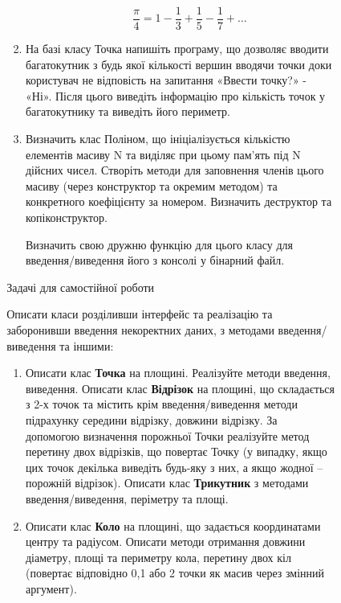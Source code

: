 \documentclass[]{article}
\makeatletter
\newcommand{\xslalph}[1]{\expandafter\@xslalph\csname c@#1\endcsname}
\newcommand{\@xslalph}[1]{%
    \ifcase#1\or а\or б\or в\or г\or д\or e\or є\or ж\or з\or i%
    \or й\or к\or л\or м\or н\or о\or п\or р\or с\or т%
    \or у\or ф\or х\or ц\or ч\or ш\or ю\or я\or аа\or бб\or вв%
    \else\@ctrerr\fi%
}
\makeatother
\begin{document}
\begin{enumerate}
\begin{enumerate}[label=\xslalph*)]
\begin{enumerate}
\begin{enumerate}[label=\xslalph*)]
\begin{enumerate}
\begin{itemize}
\[\frac{\pi}{4} = 1 - \frac{1}{3} + \frac{1}{5} - \frac{1}{7} + \ldots\]

\end{itemize}

\item
  На базі класу Точка напишіть програму, що дозволяє вводити
  багатокутник з будь якої кількості вершин вводячи точки доки
  користувач не відповість на запитання «Ввести точку?» - «Ні». Після
  цього виведіть інформацію про кількість точок у багатокутнику та
  виведіть його периметр.
\item
  Визначить клас Поліном, що ініціалізується кількістю елементів масиву
  N та виділяє при цьому пам'ять під N дійсних чисел. Створіть методи
  для заповнення членів цього масиву (через конструктор та окремим
  методом) та конкретного коефіцієнту за номером. Визначить деструктор
  та копіконструктор. 

  Визначить свою дружню функцію для цього класу для введення/виведення
його з консолі у бінарний файл.


\end{enumerate}

Задачі для самостійної роботи

Описати класи розділивши інтерфейс та реалізацію та заборонивши введення
некоректних даних, з методами введення/виведення та іншими:

\begin{enumerate}
\def\labelenumi{\arabic{enumi})}
\setcounter{enumi}{3}
\item
  Описати клас \textbf{Точка} на площині. Реалізуйте методи введення,
  виведення. Описати клас \textbf{Відрізок} на площині, що складається
  з 2-х точок та містить крім введення/виведення методи підрахунку
  середини відрізку, довжини відрізку. За допомогою визначення
  порожньої Точки реалізуйте метод перетину двох відрізків, що повертає
  Точку (у випадку, якщо цих точок декілька виведіть будь-яку з них, а
  якщо жодної -- порожній відрізок). Описати клас \textbf{Трикутник} з 
  методами введення/виведення, періметру та площі.
 

\item
  Описати клас \textbf{Коло} на площині, що задається координатами
  центру та радіусом. Описати методи отримання довжини діаметру, площі
  та периметру кола, перетину двох кіл (повертає відповідно 0,1 або 2
  точки як масив через змінний аргумент).


\end{enumerate}
\end{enumerate}
\end{enumerate}
\end{enumerate}
\end{enumerate}
\end{document}

